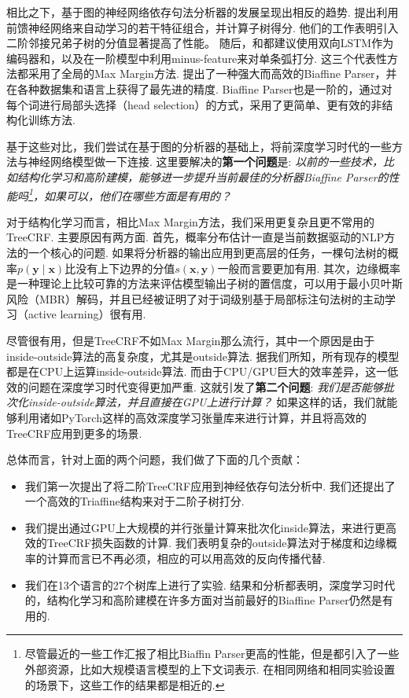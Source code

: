 相比之下，基于图的神经网络依存句法分析器的发展呈现出相反的趋势.
\cite{pei-etal-2015-effective}提出利用前馈神经网络来自动学习\cite{chen-manning-2014-fast}的若干特征组合，并计算子树得分.
他们的工作表明引入二阶邻接兄弟子树的分值显著提高了性能。
随后，\cite{wang-chang-2016-graph}和\cite{kiperwasser-goldberg-2016-simple}都建议使用双向LSTM作为编码器和，以及在一阶模型中利用minus-feature来对单条弧打分.
这三个代表性方法都采用了全局的Max Margin方法.
\cite{dozat-etal-2017-biaffine}提出了一种强大而高效的Biaffine Parser，并在各种数据集和语言上获得了最先进的精度.
Biaffine Parser也是一阶的，通过对每个词进行局部头选择（head selection）的方式\cite{zhang-etal-2017-head}，采用了更简单、更有效的非结构化训练方法.

基于这些对比，我们尝试在基于图的分析器的基础上，将前深度学习时代的一些方法与神经网络模型做一下连接.
这里要解决的\textbf{第一个问题}是:
\emph{以前的一些技术，比如结构化学习和高阶建模，能够进一步提升当前最佳的分析器Biaffine Parser的性能吗\footnote{
        尽管最近的一些工作汇报了相比Biaffin Parser更高的性能，但是都引入了一些外部资源，比如大规模语言模型的上下文词表示. 在相同网络和相同实验设置的场景下，这些工作的结果都是相近的.
    }，如果可以，他们在哪些方面是有用的？}

对于结构化学习而言，相比Max Margin方法，我们采用更复杂且更不常用的TreeCRF.
主要原因有两方面.
首先，概率分布估计一直是当前数据驱动的NLP方法的一个核心的问题\cite{le-zuidema-2014-inside}.
如果将分析器的输出应用到更高层的任务，一棵句法树的概率$p(\boldsymbol{y}\mid\boldsymbol{x})$比没有上下边界的分值$s (\boldsymbol{x},\boldsymbol{y})$一般而言要更加有用.
其次，边缘概率是一种理论上比较可靠的方法来评估模型输出子树的置信度，可以用于最小贝叶斯风险（MBR）解码\cite{smith-smith-2007-probabilistic}，并且已经被证明了对于词级别基于局部标注句法树的主动学习（active learning）\cite{li-etal-2016-active}很有用.

尽管很有用，但是TreeCRF不如Max Margin那么流行，其中一个原因是由于inside-outside算法的高复杂度，尤其是outside算法.
据我们所知，所有现存的模型都是在CPU上运算inside-outside算法.
而由于CPU/GPU巨大的效率差异，这一低效的问题在深度学习时代变得更加严重.
这就引发了\textbf{第二个问题}:
\emph{我们是否能够批次化inside-outside算法，并且直接在GPU上进行计算？}
如果这样的话，我们就能够利用诸如PyTorch这样的高效深度学习张量库来进行计算，并且将高效的TreeCRF应用到更多的场景\cite{cai-etal-2017-crf,le-zuidema-2014-inside}.

总体而言，针对上面的两个问题，我们做了下面的几个贡献：
\begin{itemize}%
    \item 我们第一次提出了将二阶TreeCRF应用到神经依存句法分析中.
          我们还提出了一个高效的Triaffine结构来对于二阶子树打分.
    \item 我们提出通过GPU上大规模的并行张量计算来批次化inside算法，来进行更高效的TreeCRF损失函数的计算.
          我们表明复杂的outside算法对于梯度和边缘概率的计算而言已不再必须，相应的可以用高效的反向传播代替.
    \item 我们在13个语言的27个树库上进行了实验.
          结果和分析都表明，深度学习时代的，结构化学习和高阶建模在许多方面对当前最好的Biaffine Parser仍然是有用的.
\end{itemize}

